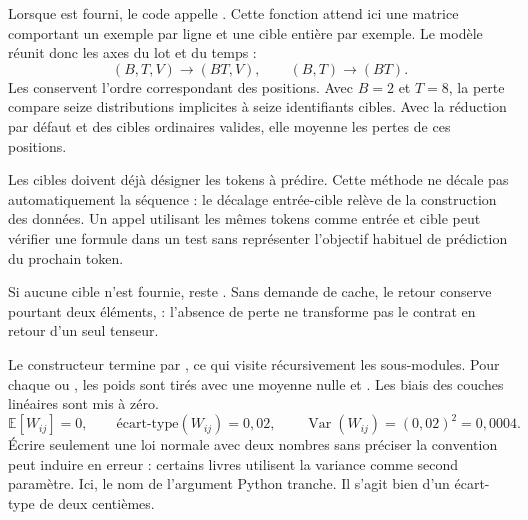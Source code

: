 Lorsque  est fourni, le code appelle . Cette fonction attend ici une matrice comportant un exemple par ligne et une cible entière par exemple. Le modèle réunit donc les axes du lot et du temps :
\[
 (B,T,V)\longrightarrow(BT,V),\qquad
 (B,T)\longrightarrow(BT).
\]
Les  conservent l'ordre correspondant des positions. Avec $B=2$ et $T=8$, la perte compare seize distributions implicites à seize identifiants cibles. Avec la réduction par défaut et des cibles ordinaires valides, elle moyenne les pertes de ces positions.

Les cibles doivent déjà désigner les tokens à prédire. Cette méthode ne décale pas automatiquement la séquence : le décalage entrée-cible relève de la construction des données. Un appel utilisant les mêmes tokens comme entrée et cible peut vérifier une formule dans un test sans représenter l'objectif habituel de prédiction du prochain token.

Si aucune cible n'est fournie,  reste . Sans demande de cache, le retour conserve pourtant deux éléments,  : l'absence de perte ne transforme pas le contrat en retour d'un seul tenseur.






Le constructeur termine par , ce qui visite récursivement les sous-modules. Pour chaque  ou , les poids sont tirés avec une moyenne nulle et . Les biais des couches linéaires sont mis à zéro.
\[
 \mathbb E[W_{ij}]=0,\qquad
 \text{écart-type}(W_{ij})=0{,}02,\qquad
 \operatorname{Var}(W_{ij})=(0{,}02)^2=0{,}0004.
\]
Écrire seulement une loi normale avec deux nombres sans préciser la convention peut induire en erreur : certains livres utilisent la variance comme second paramètre. Ici, le nom de l'argument Python tranche. Il s'agit bien d'un écart-type de deux centièmes.

